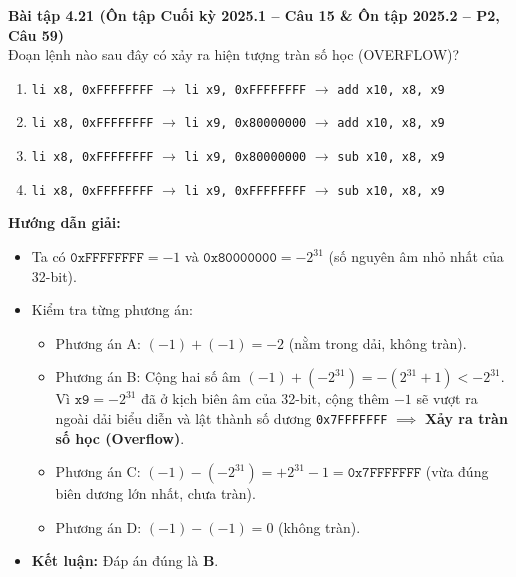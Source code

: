 \textbf{Bài tập 4.21 (Ôn tập Cuối kỳ 2025.1 -- Câu 15 \& Ôn tập 2025.2 -- P2, Câu 59)}\\
Đoạn lệnh nào sau đây có xảy ra hiện tượng tràn số học (OVERFLOW)?
\begin{enumerate}[label=\Alph*.]
    \item \texttt{li x8, 0xFFFFFFFF} $\rightarrow$ \texttt{li x9, 0xFFFFFFFF} $\rightarrow$ \texttt{add x10, x8, x9}
    \item \texttt{li x8, 0xFFFFFFFF} $\rightarrow$ \texttt{li x9, 0x80000000} $\rightarrow$ \texttt{add x10, x8, x9}
    \item \texttt{li x8, 0xFFFFFFFF} $\rightarrow$ \texttt{li x9, 0x80000000} $\rightarrow$ \texttt{sub x10, x8, x9}
    \item \texttt{li x8, 0xFFFFFFFF} $\rightarrow$ \texttt{li x9, 0xFFFFFFFF} $\rightarrow$ \texttt{sub x10, x8, x9}
\end{enumerate}
\textbf{Hướng dẫn giải:}
\begin{itemize}
    \item Ta có $\texttt{0xFFFFFFFF} = -1$ và $\texttt{0x80000000} = -2^{31}$ (số nguyên âm nhỏ nhất của 32-bit).
    \item Kiểm tra từng phương án:
    \begin{itemize}
        \item Phương án A: $(-1) + (-1) = -2$ (nằm trong dải, không tràn).
        \item Phương án B: Cộng hai số âm $(-1) + (-2^{31}) = -(2^{31} + 1) < -2^{31}$. Vì $\texttt{x9} = -2^{31}$ đã ở kịch biên âm của 32-bit, cộng thêm $-1$ sẽ vượt ra ngoài dải biểu diễn và lật thành số dương \texttt{0x7FFFFFFF} $\implies$ \textbf{Xảy ra tràn số học (Overflow)}.
        \item Phương án C: $(-1) - (-2^{31}) = +2^{31} - 1 = \texttt{0x7FFFFFFF}$ (vừa đúng biên dương lớn nhất, chưa tràn).
        \item Phương án D: $(-1) - (-1) = 0$ (không tràn).
    \end{itemize}
    \item \textbf{Kết luận:} Đáp án đúng là \textbf{B}.
\end{itemize}

